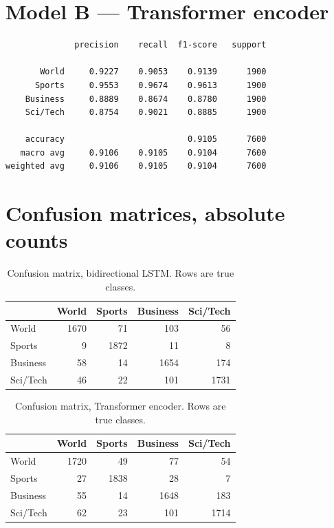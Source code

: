 \section{Model B --- Transformer encoder}

{\small
\begin{verbatim}
              precision    recall  f1-score   support

       World     0.9227    0.9053    0.9139      1900
      Sports     0.9553    0.9674    0.9613      1900
    Business     0.8889    0.8674    0.8780      1900
    Sci/Tech     0.8754    0.9021    0.8885      1900

    accuracy                         0.9105      7600
   macro avg     0.9106    0.9105    0.9104      7600
weighted avg     0.9106    0.9105    0.9104      7600
\end{verbatim}}

\section{Confusion matrices, absolute counts}

\begin{table}[ht]
\centering
\caption{Confusion matrix, bidirectional LSTM. Rows are true classes.}
\begin{tabular}{lrrrr}
\toprule
 & \textbf{World} & \textbf{Sports} & \textbf{Business} & \textbf{Sci/Tech} \\
\midrule
World    & 1670 & 71   & 103  & 56 \\
Sports   & 9    & 1872 & 11   & 8 \\
Business & 58   & 14   & 1654 & 174 \\
Sci/Tech & 46   & 22   & 101  & 1731 \\
\bottomrule
\end{tabular}
\end{table}

\begin{table}[ht]
\centering
\caption{Confusion matrix, Transformer encoder. Rows are true classes.}
\begin{tabular}{lrrrr}
\toprule
 & \textbf{World} & \textbf{Sports} & \textbf{Business} & \textbf{Sci/Tech} \\
\midrule
World    & 1720 & 49   & 77   & 54 \\
Sports   & 27   & 1838 & 28   & 7 \\
Business & 55   & 14   & 1648 & 183 \\
Sci/Tech & 62   & 23   & 101  & 1714 \\
\bottomrule
\end{tabular}
\end{table}

